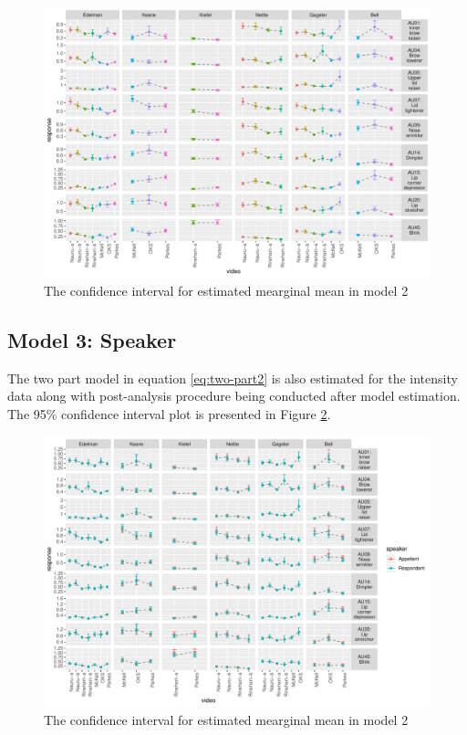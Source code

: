 \documentclass{monashthesis}
\begin{document}
\begin{figure}

{\centering \includegraphics[width=1\linewidth]{figures/intensity-video-1} 

}

\caption{The confidence interval for estimated mearginal mean in model 2}\label{fig:intensity-video}
\end{figure}

\hypertarget{model-3-speaker-2}{%
\subsection{Model 3: Speaker}\label{model-3-speaker-2}}

The two part model in equation \ref{eq:two-part2} is also estimated for the intensity data along with post-analysis procedure being conducted after model estimation. The 95\% confidence interval plot is presented in Figure \ref{fig:intensity-speaker}.

\begin{figure}

{\centering \includegraphics[width=1\linewidth]{figures/intensity-speaker-1} 

}

\caption{The confidence interval for estimated mearginal mean in model 2}\label{fig:intensity-speaker}
\end{figure}
\end{document}
